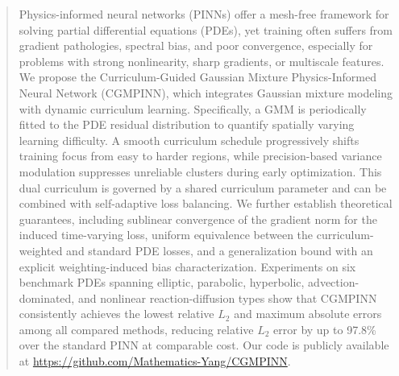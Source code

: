 \documentclass{article}
\theoremstyle{plain}
\theoremstyle{definition}
\theoremstyle{remark}
\begin{document}
	
	
	\printAffiliationsAndNotice{}
	
	\begin{abstract}
		Physics-informed neural networks (PINNs) offer a mesh-free framework for solving partial differential equations (PDEs), yet training often suffers from gradient pathologies, spectral bias, and poor convergence, especially for problems with strong nonlinearity, sharp gradients, or multiscale features. We propose the Curriculum-Guided Gaussian Mixture Physics-Informed Neural Network (CGMPINN), which integrates Gaussian mixture modeling with dynamic curriculum learning. Specifically, a GMM is periodically fitted to the PDE residual distribution to quantify spatially varying learning difficulty. A smooth curriculum schedule progressively shifts training focus from easy to harder regions, while precision-based variance modulation suppresses unreliable clusters during early optimization. This dual curriculum is governed by a shared curriculum parameter and can be combined with self-adaptive loss balancing. We further establish theoretical guarantees, including sublinear convergence of the gradient norm for the induced time-varying loss, uniform equivalence between the curriculum-weighted and standard PDE losses, and a generalization bound with an explicit weighting-induced bias characterization. Experiments on six benchmark PDEs spanning elliptic, parabolic, hyperbolic, advection-dominated, and nonlinear reaction-diffusion types show that CGMPINN consistently achieves the lowest relative $L_2$ and maximum absolute errors among all compared methods, reducing relative $L_2$ error by up to 97.8\% over the standard PINN at comparable cost. Our code is publicly available at \url{https://github.com/Mathematics-Yang/CGMPINN}.
	\end{abstract}
	
\end{document}
